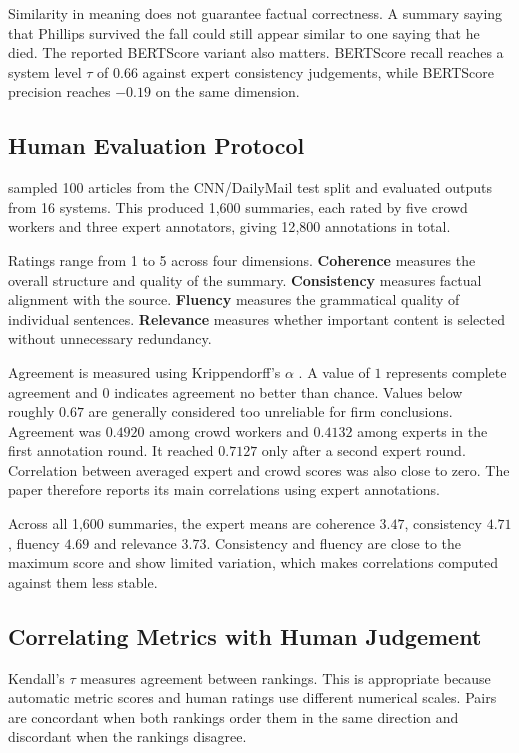 \documentclass[11pt]{article}
\begin{document}
Similarity in meaning does not guarantee factual correctness. A summary saying that Phillips survived the fall could still appear similar to one saying that he died. The reported BERTScore variant also matters. BERTScore recall reaches a system level $\tau$ of $0.66$ against expert consistency judgements, while BERTScore precision reaches $-0.19$ on the same dimension.

\subsection{Human Evaluation Protocol}
\label{sec:human}

\citet{fabbri-etal-2021-summeval} sampled 100 articles from the CNN/DailyMail test split and evaluated outputs from 16 systems. This produced 1{,}600 summaries, each rated by five crowd workers and three expert annotators, giving 12{,}800 annotations in total.

Ratings range from 1 to 5 across four dimensions. \textbf{Coherence} measures the overall structure and quality of the summary. \textbf{Consistency} measures factual alignment with the source. \textbf{Fluency} measures the grammatical quality of individual sentences. \textbf{Relevance} measures whether important content is selected without unnecessary redundancy.

Agreement is measured using Krippendorff's $\alpha$ \citep{krippendorff-2011-computing}. A value of $1$ represents complete agreement and $0$ indicates agreement no better than chance. Values below roughly $0.67$ are generally considered too unreliable for firm conclusions. Agreement was $0.4920$ among crowd workers and $0.4132$ among experts in the first annotation round. It reached $0.7127$ only after a second expert round. Correlation between averaged expert and crowd scores was also close to zero. The paper therefore reports its main correlations using expert annotations.

Across all 1{,}600 summaries, the expert means are coherence $3.47$, consistency $4.71$, fluency $4.69$ and relevance $3.73$. Consistency and fluency are close to the maximum score and show limited variation, which makes correlations computed against them less stable.

\subsection{Correlating Metrics with Human Judgement}
\label{sec:tau}

Kendall's $\tau$ \citep{kendall-1938-new} measures agreement between rankings. This is appropriate because automatic metric scores and human ratings use different numerical scales. Pairs are concordant when both rankings order them in the same direction and discordant when the rankings disagree.
\end{document}
